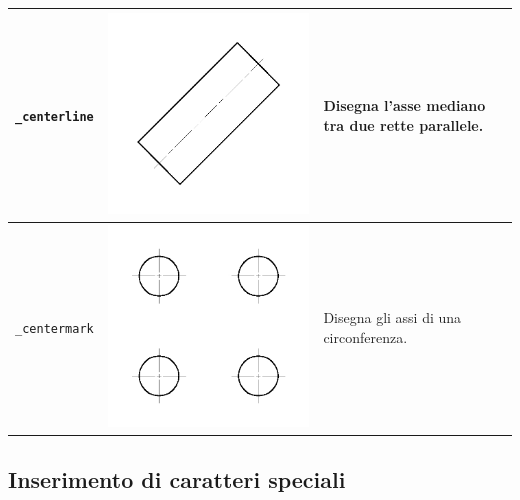 \documentclass[..]{../IEEEphot}
\begin{document}
\begin{center}
\begin{longtable}{m{.2\linewidth}m{.2\linewidth}m{.25\linewidth}m{.25\linewidth}}
\texttt{\_centerline} & \includegraphics[width = 0.8\linewidth, keepaspectratio]{../images/jpg/_centerline.jpg} & Disegna l'asse mediano tra due rette parallele. & 
\\
\midrule
\texttt{\_centermark} & \includegraphics[width = 0.8\linewidth, keepaspectratio]{../images/jpg/_centermark.jpg} & Disegna gli assi di una circonferenza. & 
\\
\bottomrule
\end{longtable}
\end{center}

\subsection{Inserimento di caratteri speciali}
\end{document}
